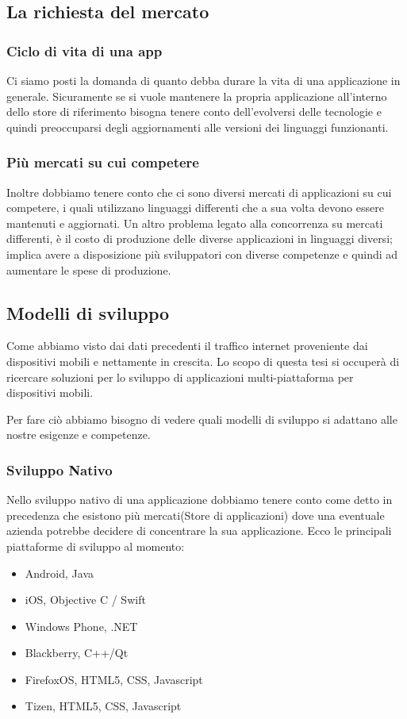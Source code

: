 \subsection{La richiesta del mercato}
\subsubsection{Ciclo di vita di una app}
Ci siamo posti la domanda di quanto debba durare la vita di una applicazione in generale. Sicuramente se si vuole mantenere la propria applicazione all'interno dello store di riferimento bisogna tenere conto dell'evolversi delle tecnologie e quindi preoccuparsi degli aggiornamenti alle versioni dei linguaggi funzionanti. 
\subsubsection{Più mercati su cui competere}
Inoltre dobbiamo tenere conto che ci sono diversi mercati di applicazioni su cui competere, i quali utilizzano linguaggi differenti che a sua volta devono essere mantenuti e aggiornati.
Un altro problema legato alla concorrenza su mercati differenti, è il costo di produzione delle diverse applicazioni in linguaggi diversi; implica avere a disposizione più sviluppatori con diverse competenze e quindi ad aumentare le spese di produzione.
\subsection{Modelli di sviluppo}
Come abbiamo visto dai dati precedenti il traffico internet proveniente dai dispositivi mobili e nettamente in crescita. Lo scopo di questa tesi si occuperà di ricercare soluzioni per lo sviluppo di applicazioni multi-piattaforma per dispositivi mobili.

Per fare ciò abbiamo bisogno di vedere quali modelli di sviluppo si adattano alle nostre esigenze e competenze.

\subsubsection{Sviluppo Nativo}
Nello sviluppo nativo di una applicazione dobbiamo tenere conto come detto in precedenza che esistono più mercati(Store di applicazioni) dove una eventuale azienda potrebbe decidere di concentrare la sua applicazione. Ecco le principali piattaforme di sviluppo al momento:

\begin{itemize}
\item Android, Java
\item iOS, Objective C / Swift
\item Windows Phone, .NET
\item Blackberry, C++/Qt
\item FirefoxOS, HTML5, CSS, Javascript
\item Tizen, HTML5, CSS, Javascript
\end{itemize}

